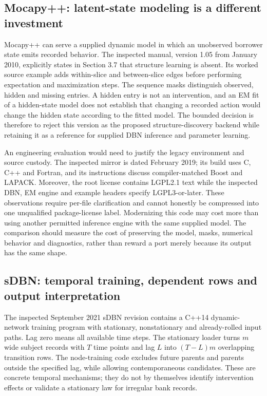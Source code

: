 \subsection{Mocapy++: latent-state modeling is a different investment}

Mocapy++ can serve a supplied dynamic model in which an unobserved borrower
state emits recorded behavior. The inspected manual, version 1.05 from January
2010, explicitly states in Section 3.7 that structure learning is absent.
Its worked source example adds within-slice and between-slice edges before
performing expectation and maximization steps. The sequence masks distinguish
observed, hidden and missing entries. A hidden entry is not an intervention,
and an EM fit of a hidden-state model does not establish that changing a
recorded action would change the hidden state according to the fitted model.
The bounded decision is therefore to reject this version as the proposed
structure-discovery backend while retaining it as a reference for supplied
DBN inference and parameter learning.\citep{exec16_ct_mocapy}

An engineering evaluation would need to justify the legacy environment and
source custody. The inspected mirror is dated February 2019; its build uses
C, C++ and Fortran, and its instructions discuss compiler-matched Boost and
LAPACK. Moreover, the root license contains LGPL2.1 text while the inspected
DBN, EM engine and example headers specify LGPL3-or-later. These observations
require per-file clarification and cannot honestly be compressed into one
unqualified package-license label. Modernizing this code may cost more than
using another permitted inference engine with the same supplied model. The
comparison should measure the cost of preserving the model, masks, numerical
behavior and diagnostics, rather than reward a port merely because its output
has the same shape.\citep{exec16_ct_mocapy,exec16_ct_design}

\subsection{sDBN: temporal training, dependent rows and output interpretation}

The inspected September 2021 sDBN revision contains a C++14 dynamic-network
training program with stationary, nonstationary and already-rolled input
paths. Lag zero means all available time steps. The stationary loader turns
$m$ wide subject records with $T$ time points and lag $L$ into
$(T-L)m$ overlapping transition rows. The node-training code excludes future
parents and parents outside the specified lag, while allowing contemporaneous
candidates. These are concrete temporal mechanisms; they do not by themselves
identify intervention effects or validate a stationary law for irregular bank
records.\citep{exec16_ct_sdbn}

